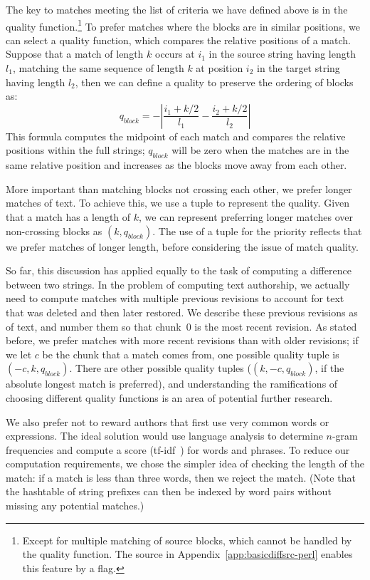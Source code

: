 The key to matches meeting the list of criteria we have
defined above is in the quality function.\footnote{Except for
multiple matching of source blocks, which cannot be handled
by the quality
function.  The source in Appendix~\ref{app:basicdiffsrc-perl}
enables this feature by a flag.}
To prefer matches where the blocks are in similar positions,
we can select a quality function, which compares the relative
positions of a match.
Suppose that a match of length $k$ occurs at $i_1$ in the source
string having length $l_1$, matching the same sequence of length $k$ at
position $i_2$ in the target string having length $l_2$,
then we can define a quality to preserve the
ordering of blocks as:
\begin{equation}
q_{block} = -\left| \frac{i_1 + k/2}{l_1} - \frac{i_2 + k/2}{l_2} \right|
\end{equation}
This formula computes the midpoint of each match and compares
the relative positions within the full strings; $q_{block}$ will be
zero when the matches are in the same relative position
and increases as the blocks move away from each other.

More important than matching blocks not crossing each other,
we prefer longer matches of text.
To achieve this, we use a tuple to represent the quality.
Given that a match has a length of $k$, we can represent preferring
longer matches over non-crossing blocks as $(k, q_{block})$.
The use of a tuple for the priority reflects that we prefer
matches of longer length, before considering the issue
of match quality.  

So far, this discussion has applied equally to the task of
computing a difference between two strings.
In the problem of computing text authorship, we actually
need to compute matches with multiple previous revisions
to account for text that was deleted and then later restored.
We describe these previous revisions as  of text,
and number them so that chunk~0 is the most recent revision.
As stated before, we prefer matches with more recent revisions
than with older
revisions; if we let $c$ be the chunk that a match comes from,
one possible quality tuple is $(-c, k, q_{block})$.
There are other possible quality tuples (\eg $(k, -c, q_{block})$,
if the absolute longest match is preferred), and
understanding the ramifications of choosing different quality
functions is an area of potential further research.

We also prefer not to reward authors that first use very common words
or expressions.
The ideal solution would use language analysis to determine
$n$-gram frequencies and compute
a score (\eg tf-idf~\cite{Jones1972}) for words and phrases.
To reduce our computation requirements, we chose the simpler idea
of checking the length of the match: if a match is less than three
words, then we reject the match.
(Note that the hashtable of string prefixes can then be indexed by
word pairs without missing any potential matches.)

